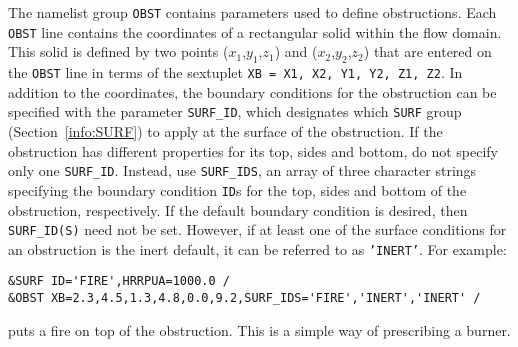 \documentclass[11pt]{book}
\newcommand{\ct}{\tt\small}
\begin{document}
The namelist group {\ct OBST} contains parameters used to define obstructions.
Each {\ct OBST} line contains the coordinates of a rectangular
solid within the flow domain. This solid is defined by two points
($x_1$,$y_1$,$z_1$) and ($x_2$,$y_2$,$z_2$) that are entered on the
{\ct OBST} line in terms of the sextuplet {\ct XB = X1, X2, Y1, Y2, Z1, Z2}.
In addition to the coordinates, the boundary conditions for the obstruction
can be specified with the parameter {\ct SURF\_ID}, which designates which
{\ct SURF} group (Section~\ref{info:SURF}) to apply at the surface of the obstruction.
If the obstruction has different properties for its top,
sides and bottom, do not specify only one {\ct SURF\_ID}. Instead, use {\ct SURF\_IDS}, an array of three character
strings specifying the boundary condition {\ct ID}s for the top,
sides and bottom of the obstruction, respectively.
If the default
boundary condition is desired, then {\ct SURF\_ID(S)} need not be set.
However, if at least one of the surface conditions for an
obstruction is the inert default, it can be referred to as {\ct 'INERT'}.
For example:

\footnotesize
\begin{verbatim}
&SURF ID='FIRE',HRRPUA=1000.0 /
&OBST XB=2.3,4.5,1.3,4.8,0.0,9.2,SURF_IDS='FIRE','INERT','INERT' /
\end{verbatim}
\normalsize
puts a fire on top of the obstruction. This is a simple way of
prescribing a burner.
\end{document}
